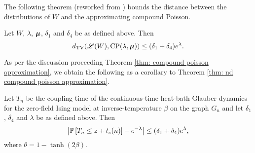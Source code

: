 	The following theorem (reworked from \cite{Barbour2001-nh}) bounds the distance between the distributions of $W$ and the approximating compound Poisson.

	\begin{theorem}
	\label{thm: nd compound poisson approximation}
		Let $W$, $\lambda$, ${\bm{{\mu}}}$, $\delta_1$ and $\delta_4$ be as defined above. Then
		\begin{equation}
			d_{\mathrm{TV}}(\mathscr{L}(W), \mathrm{CP}(\lambda, {\bm{{\mu}}})) \leq (\delta_1 + \delta_4)e^\lambda.
		\end{equation}
	\end{theorem}
	As per the discussion proceeding Theorem \ref{thm: compound poisson approximation}, we obtain the following as a corollary to Theorem \ref{thm: nd compound poisson approximation}.
	\begin{corollary}
		\label{cor:nd bound distance prob[w=0] and e^-lambda}
		Let $T_n$ be the coupling time of the continuous-time heat-bath Glauber dynamics for the zero-field Ising model at inverse-temperature $\beta$ on the graph $G_n$ and let $\delta_1$, $\delta_4$ and $\lambda$ be as defined above. Then
		\begin{equation}
			\left|\mathbb{P}\left[T_n \leq z + t_c(n)\right] - e^{-\lambda}\right| \leq (\delta_1 + \delta_4)e^\lambda,
			\label{eq:nd bound distance prob[w=0] and e^-lambda}
		\end{equation}
		where $\theta = 1 - \tanh(2\beta)$.
	\end{corollary}

